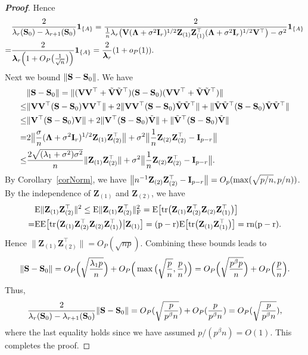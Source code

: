 \documentclass[times,sort&compress,3p]{elsarticle}
\newcommand{\mytr}{\rm tr}
\newcommand{\myE}{\rm E}
\newcommand{\bZ}{\mathbf{Z}}
\newcommand{\bfsym}[1]{\ensuremath{\boldsymbol{#1}}}
\def\blambda {\bfsym {\lambda}}        \def\bLambda {\bfsym {\Lambda}}
\theoremstyle{plain}
\theoremstyle{definition}
\theoremstyle{remark}
\begin{document}
\begin{appendices}
\begin{proof}[\textbf{Proof}]
        Hence
$$
\begin{aligned}
    &\frac{2}{\lambda_r(\BS_0)-\lambda_{r+1}(\BS_0)}\mathbf{1}_{\{A\}}
    =
    \frac{2}{
        \frac{1}{n}\lambda_r\big(\BV(\bLambda+\sigma^2 \BI_r)^{1/2}\bZ_{(1)} \bZ_{(1)}^\top (\bLambda+\sigma^2 \BI_r)^{1/2}\BV^\top \big)-\sigma^2}\mathbf{1}_{\{A\}}\\
    =&\frac{2}{\blambda_r\Big(1+O_P\big(\frac{1}{\sqrt{n}}\big)\Big)}\mathbf{1}_{\{A\}}
    =\frac{2}{\blambda_r}(1+o_P(1)).
\end{aligned}
    $$
    Next we bound $\|\mathbf{S}-\mathbf{S}_0\|$. 
    We have
    $$
    \begin{aligned}
        &\|\BS-\BS_0\|=
        \|(\BV\BV^\top +\tilde{\BV}\tilde{\BV}^\top )(\BS-\BS_0)(\BV\BV^\top +\tilde{\BV}\tilde{\BV}^\top )\|\\
        \leq& \|\BV\BV^\top  (\BS-\BS_0) \BV\BV^\top \|+2 \|\BV\BV^\top  (\BS-\BS_0) \tilde{\BV}\tilde{\BV}^\top \|+\|\tilde{\BV}\tilde{\BV}^\top  (\BS-\BS_0) \tilde{\BV}\tilde{\BV}^\top \|\\
        \leq& \|\BV^\top  (\BS-\BS_0) \BV\|+2 \|\BV^\top  (\BS-\BS_0) \tilde{\BV}\|+\|\tilde{\BV}^\top  (\BS-\BS_0) \tilde{\BV}\|\\
        = &
        2\big\|\frac{\sigma}{n}(\bLambda+\sigma^2 \BI_r)^{1/2}\bZ_{(1)} \bZ_{(2)}^\top \big\|+
        \sigma^2\big\|\frac{1}{n}\bZ_{(2)} \bZ_{(2)}^\top - \BI_{p-r}\big\|\\
        \leq & \frac{2\sqrt{(\lambda_1+\sigma^2)\sigma^2}}{n}\|\bZ_{(1)}\bZ_{(2)}^\top \|+
        \sigma^2\big\|\frac{1}{n}\bZ_{(2)} \bZ_{(2)}^\top - \BI_{p-r}\big\|.
    \end{aligned}
    $$
    By Corollary~\ref{corNorm}, we have $\big\|n^{-1}\bZ_{(2)} \bZ_{(2)}^\top - \BI_{p-r}\big\|=O_p(\max(\sqrt{p/n},p/n))$.
    By the independence of $\bZ_{(1)}$ and $\bZ_{(2)}$, we have
    $$
    \begin{aligned}
        &\myE \|\bZ_{(1)}\bZ_{(2)}^\top \|^2\leq
    \myE \|\bZ_{(1)}\bZ_{(2)}^\top \|_F^2
    =
    \myE \big[ \mytr\big(\bZ_{(1)}\bZ_{(2)}^\top \bZ_{(2)}\bZ_{(1)}^\top \big) \big]\\
        =&
        \myE\myE \big[ \mytr\big(\bZ_{(1)}\bZ_{(2)}^\top \bZ_{(2)}\bZ_{(1)}^\top \big)\big|\BZ_{(1)} \big]
        =(p-r)
    \myE \big[ \mytr\big(\bZ_{(1)}\bZ_{(1)}^\top \big) \big]
        =rn(p-r).
    \end{aligned}
    $$
    Hence $\|\bZ_{(1)}\bZ_{(2)}^\top \|=O_P(\sqrt{np})$.
    Combining these bounds leads to
    $$
    \|\mathbf{S}-\mathbf{S}_0\|=
 O_P\Big(\sqrt{\frac{\lambda_1 p}{n}}\Big)+O_P\Big(\max\big(\sqrt{\frac{p}{n}},\frac{p}{n}\big)\Big)
    =
    O_P\Big(\sqrt{\frac{ p^{\beta}p}{n}}\Big)+O_P\Big(\frac{p}{n}\Big).
    $$
    Thus,
    $$
   \frac{2}{\lambda_r(\mathbf{S}_0)-\lambda_{r+1}(\mathbf{S}_0)}\|\mathbf{S}-\mathbf{S}_0\|=
    O_P(\sqrt{\frac{p}{p^{\beta}n}})+O_P(\frac{p}{p^{\beta}n})=
O_P(\sqrt{\frac{p}{p^{\beta}n}}),
    $$
    where the last equality holds since we have assumed $p/(p^{\beta}n)=O(1)$.
    This completes the proof.


\end{proof}
\end{appendices}
\end{document}
